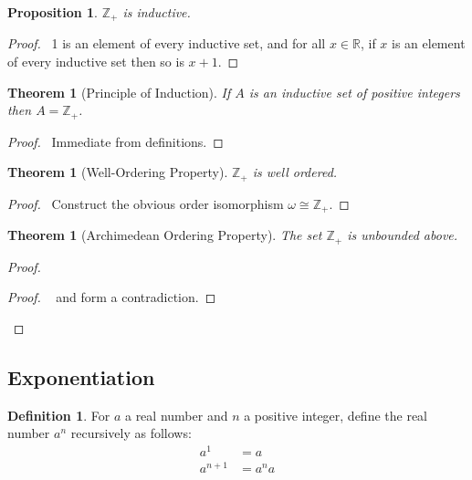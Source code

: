 \documentclass{book}
\let\qed\relax
\newtheorem{prop}[ax]{Proposition}
\newtheorem{thm}[ax]{Theorem}
\theoremstyle{definition}
\newtheorem{df}[ax]{Definition}
\begin{document}
\begin{prop}
$\mathbb{Z}_+$ is inductive.
\end{prop}

\begin{proof}
\pf\ 1 is an element of every inductive set, and for all $x \in \mathbb{R}$, if $x$ is an element of every inductive set then so is $x + 1$. \qed
\end{proof}

\begin{thm}[Principle of Induction]
If $A$ is an inductive set of positive integers then $A = \mathbb{Z}_+$.
\end{thm}

\begin{proof}
\pf\ Immediate from definitions. \qed
\end{proof}

\begin{thm}[Well-Ordering Property]
$\mathbb{Z}_+$ is well ordered.
\end{thm}

\begin{proof}
\pf\ Construct the obvious order isomorphism $\omega \cong \mathbb{Z}_+$. \qed
\end{proof}

\begin{thm}[Archimedean Ordering Property]
The set $\mathbb{Z}_+$ is unbounded above.
\end{thm}

\begin{proof}
\pf
{}
\qedstep
\begin{proof}
	\pf\  and  form a contradiction.
\end{proof}
\qed
\end{proof}

\subsection{Exponentiation}

\begin{df}
For $a$ a real number and $n$ a positive integer, define the real number $a^n$ recursively as follows:
\begin{align*}
a^1 & = a \\
a^{n+1} & = a^n a
\end{align*}
\end{df}
\end{document}
